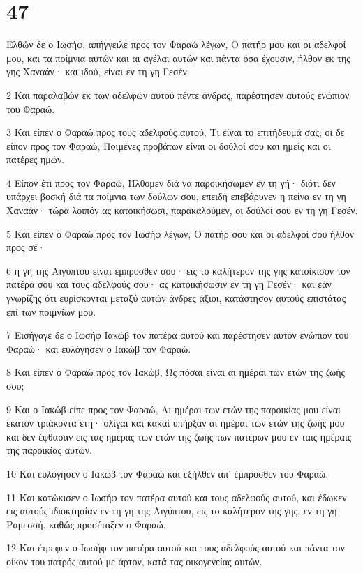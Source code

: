 \chapter{47}

\par Ελθών δε ο Ιωσήφ, απήγγειλε προς τον Φαραώ λέγων, Ο πατήρ μου και οι αδελφοί μου, και τα ποίμνια αυτών και αι αγέλαι αυτών και πάντα όσα έχουσιν, ήλθον εκ της γης Χαναάν· και ιδού, είναι εν τη γη Γεσέν.
\par 2 Και παραλαβών εκ των αδελφών αυτού πέντε άνδρας, παρέστησεν αυτούς ενώπιον του Φαραώ.
\par 3 Και είπεν ο Φαραώ προς τους αδελφούς αυτού, Τι είναι το επιτήδευμά σας; οι δε είπον προς τον Φαραώ, Ποιμένες προβάτων είναι οι δούλοί σου και ημείς και οι πατέρες ημών.
\par 4 Είπον έτι προς τον Φαραώ, Ήλθομεν διά να παροικήσωμεν εν τη γή· διότι δεν υπάρχει βοσκή διά τα ποίμνια των δούλων σου, επειδή επεβάρυνεν η πείνα εν τη γη Χαναάν· τώρα λοιπόν ας κατοικήσωσι, παρακαλούμεν, οι δούλοί σου εν τη γη Γεσέν.
\par 5 Και είπεν ο Φαραώ προς τον Ιωσήφ λέγων, Ο πατήρ σου και οι αδελφοί σου ήλθον προς σέ·
\par 6 η γη της Αιγύπτου είναι έμπροσθέν σου· εις το καλήτερον της γης κατοίκισον τον πατέρα σου και τους αδελφούς σου· ας κατοικήσωσιν εν τη γη Γεσέν· και εάν γνωρίζης ότι ευρίσκονται μεταξύ αυτών άνδρες άξιοι, κατάστησον αυτούς επιστάτας επί των ποιμνίων μου.
\par 7 Εισήγαγε δε ο Ιωσήφ Ιακώβ τον πατέρα αυτού και παρέστησεν αυτόν ενώπιον του Φαραώ· και ευλόγησεν ο Ιακώβ τον Φαραώ.
\par 8 Και είπεν ο Φαραώ προς τον Ιακώβ, Ως πόσαι είναι αι ημέραι των ετών της ζωής σου;
\par 9 Και ο Ιακώβ είπε προς τον Φαραώ, Αι ημέραι των ετών της παροικίας μου είναι εκατόν τριάκοντα έτη· ολίγαι και κακαί υπήρξαν αι ημέραι των ετών της ζωής μου και δεν έφθασαν εις τας ημέρας των ετών της ζωής των πατέρων μου εν ταις ημέραις της παροικίας αυτών.
\par 10 Και ευλόγησεν ο Ιακώβ τον Φαραώ και εξήλθεν απ' έμπροσθεν του Φαραώ.
\par 11 Και κατώκισεν ο Ιωσήφ τον πατέρα αυτού και τους αδελφούς αυτού, και έδωκεν εις αυτούς ιδιοκτησίαν εν τη γη της Αιγύπτου, εις το καλήτερον της γης, εν τη γη Ραμεσσή, καθώς προσέταξεν ο Φαραώ.
\par 12 Και έτρεφεν ο Ιωσήφ τον πατέρα αυτού και τους αδελφούς αυτού και πάντα τον οίκον του πατρός αυτού με άρτον, κατά τας οικογενείας αυτών.
